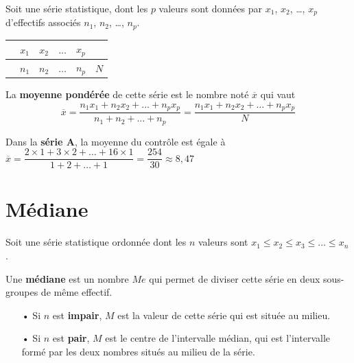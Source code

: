 \documentclass[a4paper,10pt]{report}
\begin{document}
\begin{defn}

\begin{minipage}{9cm}
Soit une série statistique, dont les $p$ valeurs sont données par $x_1$, $x_2$, \dots, $x_p$ d'effectifs associés $n_1$, $n_2$, \dots, $n_p$.
\end{minipage}
\begin{minipage}{7cm}
\begin{center}
   \renewcommand{\arraystretch}{1.5}   
   \begin{tabular}{|c|*{4}{C{0.4}|}c|}
      \hline       
       & $x_1$ & $x_2$ & $\dots$ & $x_p$ &  \\
      \hline
       & $n_1$ & $n_2$ & $\dots$ & $n_p$ & $N$ \\ 
      \hline
   \end{tabular}
\end{center}
\end{minipage}
   
\noindent La \textbf{moyenne pondérée} de cette série est le nombre noté $\overline{x}$ qui vaut   $$\overline{x}=\dfrac{n_1x_1+n_2x_2+...+n_px_p}{n_1+n_2+...+n_p} = \dfrac{n_1x_1+n_2x_2+...+n_px_p}{N}$$
\end{defn}
\medskip

\begin{ex}
Dans la \textbf{série A}, la moyenne du contrôle est égale à \quad $\overline{x} =\dfrac{2\times1+3\times2+\dots+16\times1}{1+2+\dots +1} =\dfrac{254}{30} \approx 8,47$
\end{ex}

\vspace{-5mm}
\section{Médiane}

\vspace{-2mm}
\begin{defn}
   Soit une série statistique ordonnée dont les $n$ valeurs sont $x_1\leqslant x_2 \leqslant x_3 \leqslant \dots \leqslant x_n$.
   
\noindent Une \textbf{médiane} est un nombre $Me$ qui permet de diviser cette série en deux sous-groupes de même effectif.
   \begin{enumerate}
      \item[•] Si $n$ est \textbf{impair}, $M$ est la valeur de cette série qui est située au milieu.%
      \item[•] Si $n$ est \textbf{pair}, $M$ est le centre de l'intervalle médian, qui est l'intervalle formé par les deux nombres situés \og au milieu \fg{} de la série.%
   \end{enumerate}
\end{defn}
\medskip
\end{document}
